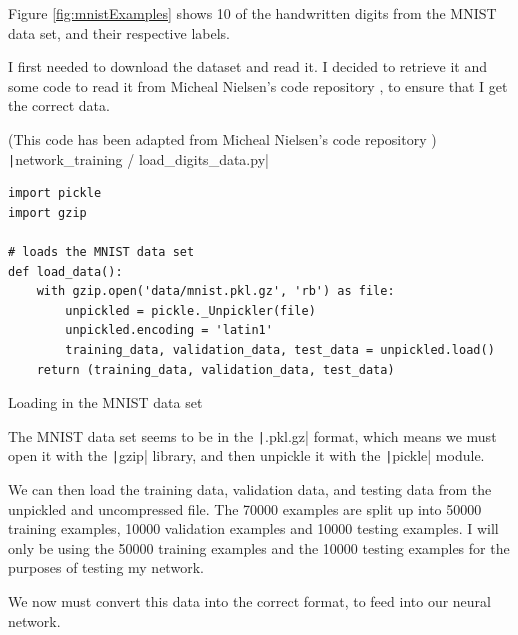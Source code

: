 \documentclass[12pt]{report}
\newcommand{\pil}[1]{\protect\texttt|#1|}
\begin{document}
Figure \ref{fig:mnistExamples} shows 10 of the handwritten digits from the MNIST data set, and their respective labels.

I first needed to download the dataset and read it. I decided to retrieve it and some code to read it from Micheal Nielsen's code repository \cite{mnielsenGithub}, to ensure that I get the correct data.

\begin{listing}[H]
(This code has been adapted from Micheal Nielsen's code repository \cite{mnielsenGithub}) \\
\pil{network_training / load_digits_data.py}
\begin{verbatim}
import pickle
import gzip

# loads the MNIST data set
def load_data():
    with gzip.open('data/mnist.pkl.gz', 'rb') as file:
        unpickled = pickle._Unpickler(file)
        unpickled.encoding = 'latin1'
        training_data, validation_data, test_data = unpickled.load()
    return (training_data, validation_data, test_data)
\end{verbatim}
\caption{Loading in the MNIST data set}\label{cs:loadMNIST}
\end{listing}

The MNIST data set seems to be in the \pil{.pkl.gz} format, which means we must open it with the \pil{gzip} library, and then unpickle it with the \pil{pickle} module.

We can then load the training data, validation data, and testing data from the unpickled and uncompressed file. The 70000 examples are split up into 50000 training examples, 10000 validation examples and 10000 testing examples. I will only be using the 50000 training examples and the 10000 testing examples for the purposes of testing my network.

We now must convert this data into the correct format, to feed into our neural network.
\end{document}
